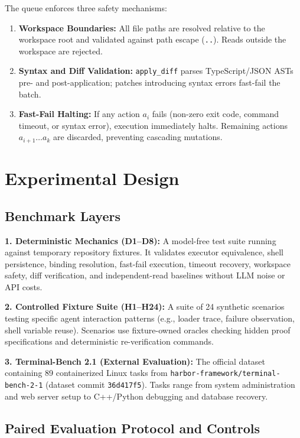 \documentclass{article}
\begin{document}
The queue enforces three safety mechanisms:
\begin{enumerate}
    \item \textbf{Workspace Boundaries:} All file paths are resolved relative to the workspace root and validated against path escape (\texttt{..}). Reads outside the workspace are rejected.
    \item \textbf{Syntax and Diff Validation:} \texttt{apply\_diff} parses TypeScript/JSON ASTs pre- and post-application; patches introducing syntax errors fast-fail the batch.
    \item \textbf{Fast-Fail Halting:} If any action $a_i$ fails (non-zero exit code, command timeout, or syntax error), execution immediately halts. Remaining actions $a_{i+1} \dots a_k$ are discarded, preventing cascading mutations.
\end{enumerate}

\section{Experimental Design}

\subsection{Benchmark Layers}

\textbf{1. Deterministic Mechanics (D1--D8):} A model-free test suite running against temporary repository fixtures. It validates executor equivalence, shell persistence, binding resolution, fast-fail execution, timeout recovery, workspace safety, diff verification, and independent-read baselines without LLM noise or API costs.

\textbf{2. Controlled Fixture Suite (H1--H24):} A suite of 24 synthetic scenarios testing specific agent interaction patterns (e.g., loader trace, failure observation, shell variable reuse). Scenarios use fixture-owned oracles checking hidden proof specifications and deterministic re-verification commands.

\textbf{3. Terminal-Bench 2.1 (External Evaluation):} The official dataset containing 89 containerized Linux tasks from \texttt{harbor-framework/terminal-bench-2-1} (dataset commit \texttt{36d417f5}). Tasks range from system administration and web server setup to C++/Python debugging and database recovery.

\subsection{Paired Evaluation Protocol and Controls}
\end{document}
